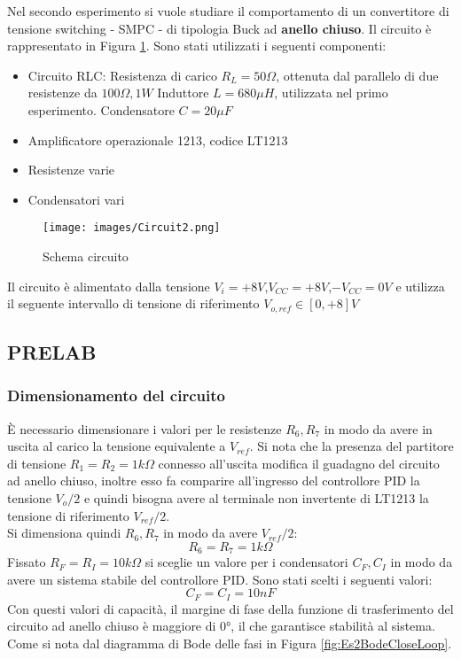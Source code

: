Nel secondo esperimento si vuole studiare il comportamento di un convertitore di tensione switching - SMPC - di tipologia Buck ad \textbf{anello chiuso}. Il circuito è rappresentato in Figura \ref{fig:Circuit2}. Sono stati utilizzati i seguenti componenti:
\begin{itemize}
    \item Circuito RLC:
    \subitem Resistenza di carico $R_L=50\Omega$, ottenuta dal parallelo di due resistenze da $100\Omega,1W$
    \subitem Induttore $L=680\mu H$, utilizzata nel primo esperimento.
    \subitem Condensatore $C=20\mu F$
    \item Amplificatore operazionale 1213, codice LT1213
    \item Resistenze varie 
    \item Condensatori vari
\end{itemize}
\begin{figure}[H]
    \centering
    \texttt{[image: images/Circuit2.png]}
    \caption{Schema circuito}
    \label{fig:Circuit2}
\end{figure}
Il circuito è alimentato dalla tensione $V_i=+8V$,$V_{CC}=+8V$,$-V_{CC}=0V$ e utilizza il seguente intervallo di tensione di riferimento $V_{o,ref}\in [0,+8]V$
\clearpage


\subsection{PRELAB}
\subsubsection{Dimensionamento del circuito}
È necessario dimensionare i valori per le resistenze $R_6,R_7$ in modo da avere in uscita al carico la tensione equivalente a $V_{ref}$. 
Si nota che la presenza del partitore di tensione $R_1=R_2=1k\Omega$ connesso all'uscita modifica il guadagno del circuito ad anello chiuso, inoltre esso fa comparire all'ingresso del controllore PID la tensione $V_o/2$ e quindi bisogna avere al terminale non invertente di LT1213 la tensione di riferimento $V_{ref}/2$.\\Si dimensiona quindi $R_6,R_7$ in modo da avere $V_{ref}/2$:
\begin{equation*}
    R_6=R_7=1k\Omega
\end{equation*}
Fissato $R_F=R_I=10k\Omega$ si sceglie un valore per i condensatori $C_F,C_I$ in modo da avere un sistema stabile del controllore PID.
Sono stati scelti i seguenti valori:
\begin{equation*}
    C_F=C_I=10nF
\end{equation*}
Con questi valori di capacità, il margine di fase della funzione di trasferimento del circuito ad anello chiuso è maggiore di 0°, il che garantisce stabilità al sistema. Come si nota dal diagramma di Bode delle fasi in Figura \ref{fig:Es2BodeCloseLoop}.
